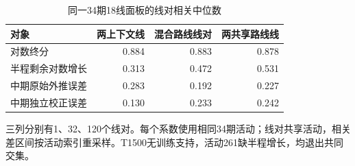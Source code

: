 \begin{table}[!htbp]\centering
\caption{同一34期18线面板的线对相关中位数}\label{tab:matchedcorr}
\small\setlength{\tabcolsep}{4pt}\renewcommand{\arraystretch}{1.15}
\begin{tabularx}{\linewidth}{L r r r}\toprule
对象 & 两上下文线 & 混合路线线对 & 两共享路线线 \\
\midrule
对数终分 & 0.884 & 0.883 & 0.878 \\
半程剩余对数增长 & 0.313 & 0.472 & 0.531 \\
中期原始外推误差 & 0.283 & 0.192 & 0.227 \\
中期独立校正误差 & 0.130 & 0.233 & 0.242 \\
\bottomrule\end{tabularx}
\par\vspace{4pt}\begin{minipage}{\linewidth}\footnotesize 三列分别有1、32、120个线对。每个系数使用相同34期活动；线对共享活动，相关差区间按活动索引重采样。T1500无训练支持，活动261缺半程增长，均退出共同交集。\end{minipage}
\end{table}
